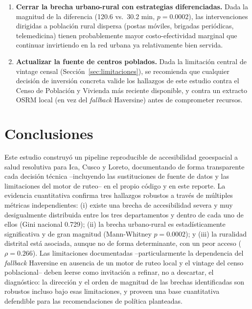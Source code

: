 \documentclass[11pt]{article}
\begin{document}
\begin{enumerate}
    poblacional aplicada en este estudio.
  \item \textbf{Cerrar la brecha urbano-rural con estrategias
    diferenciadas.} Dada la magnitud de la diferencia (120.6 vs.\ 30.2
    min, $p = 0.0002$), las intervenciones dirigidas a población rural
    dispersa (postas móviles, brigadas periódicas, telemedicina) tienen
    probablemente mayor costo-efectividad marginal que continuar
    invirtiendo en la red urbana ya relativamente bien servida.
  \item \textbf{Actualizar la fuente de centros poblados.} Dada la
    limitación central de vintage censal (Sección~\ref{sec:limitaciones}),
    se recomienda que cualquier decisión de inversión concreta valide los
    hallazgos de este estudio contra el Censo de Población y Vivienda más
    reciente disponible, y contra un extracto OSRM local (en vez del
    \textit{fallback} Haversine) antes de comprometer recursos.
\end{enumerate}

\section{Conclusiones}

Este estudio construyó un pipeline reproducible de accesibilidad
geoespacial a salud resolutiva para Ica, Cusco y Loreto, documentando de
forma transparente cada decisión técnica --incluyendo las sustituciones de
fuente de datos y las limitaciones del motor de ruteo-- en el propio código
y en este reporte. La evidencia cuantitativa confirma tres hallazgos
robustos a través de múltiples métricas independientes: (i) existe una
brecha de accesibilidad severa y muy desigualmente distribuida entre los
tres departamentos y dentro de cada uno de ellos (Gini nacional 0.729);
(ii) la brecha urbano-rural es estadísticamente significativa y de gran
magnitud (Mann-Whitney $p = 0.0002$); y (iii) la ruralidad distrital está
asociada, aunque no de forma determinante, con un peor acceso
($\rho = 0.266$). Las limitaciones documentadas --particularmente la
dependencia del \textit{fallback} Haversine en ausencia de un motor de
ruteo local y el vintage del censo poblacional-- deben leerse como
invitación a refinar, no a descartar, el diagnóstico: la dirección y el
orden de magnitud de las brechas identificadas son robustos incluso bajo
esas limitaciones, y proveen una base cuantitativa defendible para las
recomendaciones de política planteadas.
\end{document}
